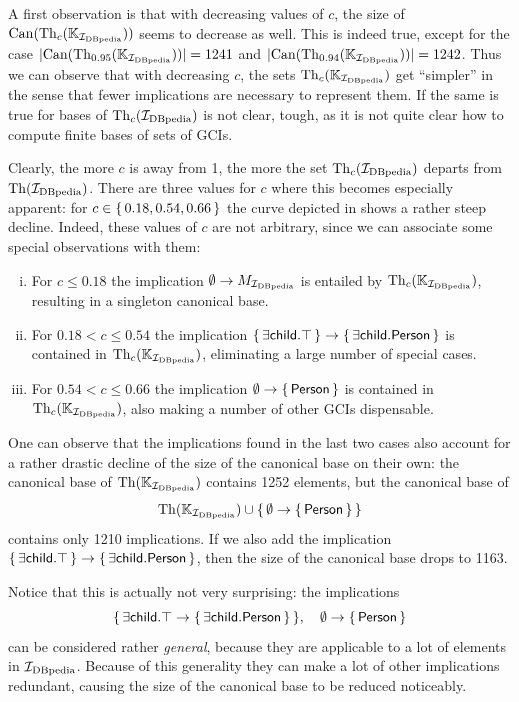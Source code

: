 A first observation is that with decreasing values of $c$, the size of $\operatorname{Can}(\operatorname{Th}_c({\mathbb{K}}_{{\mathcal{I}_{\text{DBpedia}}}}))$ seems to decrease as well.  This is indeed true, except for the case
$\lvert \operatorname{Can}(\operatorname{Th}_{0.95}({\mathbb{K}}_{{\mathcal{I}_{\text{DBpedia}}}})) \rvert = 1241$ and $\lvert \operatorname{Can}( \operatorname{Th}_{0.94}({\mathbb{K}}_{{\mathcal{I}_{\text{DBpedia}}}})) \rvert = 1242$.  Thus we can observe that with decreasing $c$, the sets
$\operatorname{Th}_c({\mathbb{K}}_{{\mathcal{I}_{\text{DBpedia}}}})$ get ``simpler'' in the sense that fewer implications are
necessary to represent them.  If the same is true for bases of $\operatorname{Th}_c({\mathcal{I}_{\text{DBpedia}}})$ is not
clear, tough, as it is not quite clear how to compute finite bases of sets of GCIs.

Clearly, the more $c$ is away from 1, the more the set $\operatorname{Th}_c({\mathcal{I}_{\text{DBpedia}}})$ departs from
$\operatorname{Th}({\mathcal{I}_{\text{DBpedia}}})$.  There are three values for $c$ where this becomes especially apparent:
for $c \in {\ensuremath{\{\, 0.18, 0.54, 0.66 \,\}}}$ the curve depicted in
 shows a rather steep decline.  Indeed, these values of
$c$ are not arbitrary, since we can associate some special observations with them:
\begin{enumerate}[i. ]
\item For $c \leq 0.18$ the implication $\emptyset \to M_{{\mathcal{I}_{\text{DBpedia}}}}$ is entailed by
  $\operatorname{Th}_c({\mathbb{K}}_{{\mathcal{I}_{\text{DBpedia}}}})$, resulting in a singleton canonical base.
\item For $0.18 < c \leq 0.54$ the implication ${\{\, \mathsf{\exists child. \top} \,\}} \to
  {\ensuremath{\{\, \mathsf{\exists child. Person} \,\}}}$ is contained in $\operatorname{Th}_c({\mathbb{K}}_{{\mathcal{I}_{\text{DBpedia}}}})$,
  eliminating a large number of special cases.
\item For $0.54 < c \leq 0.66$ the implication $\emptyset \to {\ensuremath{\{\, \mathsf{Person} \,\}}}$ is
  contained in $\operatorname{Th}_c({\mathbb{K}}_{{\mathcal{I}_{\text{DBpedia}}}})$, also making a number of other GCIs
  dispensable.
\end{enumerate}

One can observe that the implications found in the last two cases also account for a
rather drastic decline of the size of the canonical base on their own: the canonical base
of $\operatorname{Th}({\mathbb{K}}_{{\mathcal{I}_{\text{DBpedia}}}})$ contains 1252 elements, but the canonical base of
\begin{equation*}
  \operatorname{Th}({\mathbb{K}}_{{\mathcal{I}_{\text{DBpedia}}}}) \cup {\ensuremath{\{\, \emptyset \to {\ensuremath{\{\, \mathsf{Person} \,\}}} \,\}}}
\end{equation*}
contains only 1210 implications.  If we also add the implication ${\{\, \mathsf{\exists
    child. \top} \,\}} \to {\ensuremath{\{\, \mathsf{\exists child. Person} \,\}}}$, then the size of the
canonical base drops to 1163.

Notice that this is actually not very surprising: the implications
\begin{equation*}
  {\ensuremath{\{\, \mathsf{\exists  child. \top} \to {\ensuremath{\{\, \mathsf{\exists child. Person} \,\}}} \,\}}}, \quad
  \emptyset \to {\ensuremath{\{\, \mathsf{Person} \,\}}}
\end{equation*}
can be considered rather \emph{general}, because they are applicable to a lot of elements
in ${\mathcal{I}_{\text{DBpedia}}}$.  Because of this generality they can make a lot of other implications
redundant, causing the size of the canonical base to be reduced noticeably.

